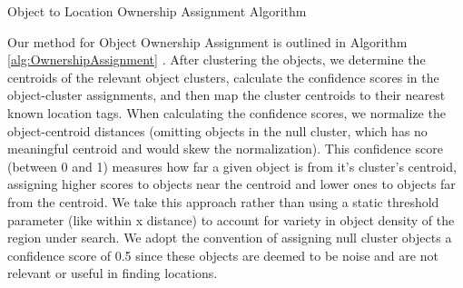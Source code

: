 \begin{algorithm}
	\caption{Object to Location Ownership Assignment Algorithm}
	\label{alg:OwnershipAssignment}
	\begin{algorithmic}
		\State{- - - - - - - - - -}
				\EndFor
			\EndFor
			\EndFor
			\EndFor 
		\EndProcedure
	\end{algorithmic}
\end{algorithm}


Our method for Object Ownership Assignment is outlined in Algorithm \ref{alg:OwnershipAssignment} . 
After clustering the objects, we determine the centroids of the relevant object clusters, calculate the confidence scores in the object-cluster assignments, and then map the cluster centroids to their nearest known location tags. 
When calculating the confidence scores, we normalize the object-centroid distances (omitting objects in the null cluster, which has no meaningful centroid and would skew the normalization). 
This confidence score (between 0 and 1) measures how far a given object is from it's cluster's centroid, assigning higher scores to objects near the centroid and lower ones to objects far from the centroid. 
We take this approach rather than using a static threshold parameter (like within x distance) to account for variety in object density of the region under search. 
We adopt the convention of assigning null cluster objects a confidence score of 0.5 since these objects are deemed to be noise and are not relevant or useful in finding locations.

